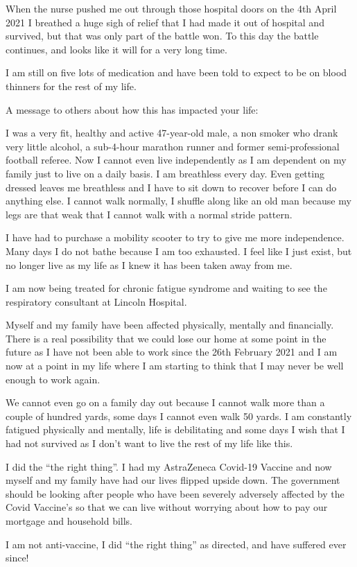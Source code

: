 {When the nurse pushed me out through those hospital doors on the 4th April 2021 I breathed a huge sigh of relief that I had made it out of hospital and survived, but that was only part of the battle won. To this day the battle continues, and looks like it will for a very long time.

I am still on five lots of medication and have been told to expect to be on blood thinners for the rest of my life.

A message to others about how this has impacted your life:

I was a very fit, healthy and active 47-year-old male, a non smoker who drank very little alcohol, a sub-4-hour marathon runner and former semi-professional football referee. Now I cannot even live independently as I am dependent on my family just to live on a daily basis. I am breathless every day. Even getting dressed leaves me breathless and I have to sit down to recover before I can do anything else. I cannot walk normally, I shuffle along like an old man because my legs are that weak that I cannot walk with a normal stride pattern.

I have had to purchase a mobility scooter to try to give me more independence. Many days I do not bathe because I am too exhausted. I feel like I just exist, but no longer live as my life as I knew it has been taken away from me.

I am now being treated for chronic fatigue syndrome and waiting to see the respiratory consultant at Lincoln Hospital.

Myself and my family have been affected physically, mentally and financially. There is a real possibility that we could lose our home at some point in the future as I have not been able to work since the 26th February 2021 and I am now at a point in my life where I am starting to think that I may never be well enough to work again.

We cannot even go on a family day out because I cannot walk more than a couple of hundred yards, some days I cannot even walk 50 yards. I am constantly fatigued physically and mentally, life is debilitating and some days I wish that I had not survived as I don’t want to live the rest of my life like this.

I did the “the right thing”. I had my AstraZeneca Covid-19 Vaccine and now myself and my family have had our lives flipped upside down. The government should be looking after people who have been severely adversely affected by the Covid Vaccine’s so that we can live without worrying about how to pay our mortgage and household bills.

I am not anti-vaccine, I did “the right thing” as directed, and have suffered ever since!
}
